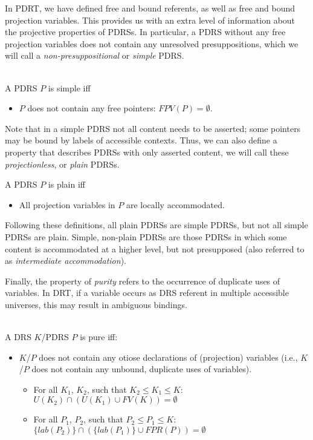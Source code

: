 In PDRT, we have defined free and bound referents, as well as free and bound
projection variables. This provides us with an extra level of information
about the projective properties of PDRSs. In particular, a PDRS without any
free projection variables does not contain any unresolved presuppositions,
which we will call a \textit{non-presuppositional} or \textit{simple} PDRS.

\begin{definition}[Simpleness]~\\
A PDRS $P$ is simple iff
\begin{itemize}
  \item $P$ does not contain any free pointers: $FPV(P) = \emptyset$.
\end{itemize}
\end{definition}

\noindent Note that in a simple PDRS not all content needs to be asserted;
some pointers may be bound by labels of accessible contexts. Thus, we can
also define a property that describes PDRSs with only asserted content, we
will call these  \textit{projectionless}, or \textit{plain} PDRSs.

\begin{definition}[Plainness]
A PDRS $P$ is plain iff
\begin{itemize}
  \item All projection variables in $P$ are locally accommodated.
\end{itemize}
\end{definition}

\noindent Following these definitions, all plain PDRSs are simple PDRSs, but
not all simple PDRSs are plain. Simple, non-plain PDRSs are those PDRSs in
which some content is accommodated at a higher level, but not presupposed
(also referred to as \textit{intermediate accommodation}).%

Finally, the property of \emph{purity} refers to the occurrence of duplicate
uses of variables. In DRT, if a variable occurs as DRS referent in multiple
accessible universes, this may result in ambiguous bindings. %

\begin{definition}[Purity]~\\
A DRS $K$/PDRS $P$ is pure iff:
\begin{itemize}
  \item $K$/$P$ does not contain any otiose declarations of (projection) variables
    (i.e., $K$/$P$ does not contain any unbound, duplicate uses of variables).
    \begin{itemize}
      \item For all $K_1$, $K_2$, such that $K_2 \leq K_1 \leq K$: 
        $U(K_2) \cap (U(K_1) \cup FV(K)) = \emptyset$
      \item For all $P_1$, $P_2$, such that $P_2 \leq P_1 \leq K$: 
        $\{lab(P_2)\} \cap (\{lab(P_1)\} \cup FPR(P)) = \emptyset$
    \end{itemize}
\end{itemize}
\end{definition}


